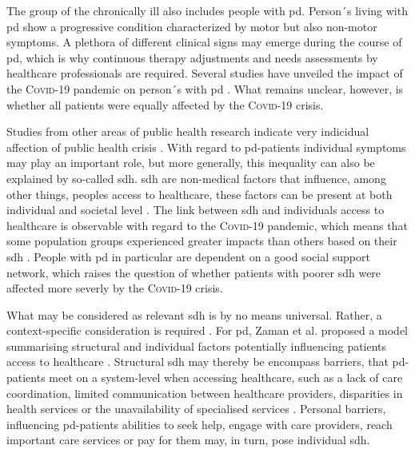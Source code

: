 \documentclass{bmcart}
\begin{document}
The group of the chronically ill also includes people with \ac{pd}. Person´s living with \ac{pd} show a progressive condition characterized by motor but also non-motor symptoms. A plethora of different clinical signs may emerge during the course of \ac{pd}, which is why  continuous therapy adjustments and needs assessments by healthcare professionals are required. Several studies have unveiled the impact of the \textsc{Covid}-19 pandemic on person´s with \ac{pd} \cite{yogev2021covid, zipprich2020knowledge, frundt2022impact, richter2021analysis, brooks2021social}. What remains unclear, however, is whether all patients were equally affected by the \textsc{Covid}-19 crisis.

Studies from other areas of public health research indicate very indicidual affection of public health crisis \cite{huijts2017prevalence, lowcock2012social}. With regard to \ac{pd}-patients individual symptoms may play an important role, but more generally, this inequality can also be explained by so-called \ac{sdh}. \ac{sdh} are non-medical factors that influence, among other things, peoples access to healthcare, these factors can be present at both individual and societal level \cite{world2010conceptual}. The link between \ac{sdh} and individuals access to healthcare is observable with regard to the \textsc{Covid}-19 pandemic, which means that some population groups experienced greater impacts than others based on their \ac{sdh} \cite{whocovidbrief}. People with \ac{pd} in particular are dependent on a good social support network, which raises the question of whether patients with poorer \ac{sdh} were affected more severly by the \textsc{Covid}-19 crisis.

What may be considered as relevant \ac{sdh} is by no means universal. Rather, a context-specific consideration is required \cite{world2010conceptual}. For \ac{pd}, Zaman et al. proposed a model summarising structural and individual factors potentially influencing patients access to healthcare \cite{zaman2021barriers}. Structural \ac{sdh} may thereby be encompass barriers, that \ac{pd}-patients meet on a system-level when accessing healthcare, such as a lack of care coordination, limited communication between healthcare providers, disparities in health services or the unavailability of specialised services \cite{zaman2021barriers}. Personal barriers, influencing \ac{pd}-patients abilities  to seek help, engage with care providers, reach important care services or pay for them \cite{zaman2021barriers} may, in turn, pose individual \ac{sdh}.
\end{document}
